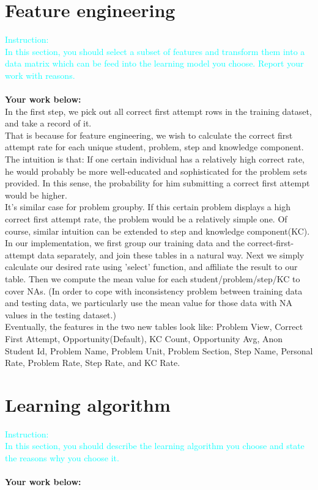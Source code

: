 \documentclass{article}
\begin{document}
\section{Feature engineering}
\textcolor{cyan}{Instruction: \\
In this section, you should select a subset of features and transform them into a data matrix which can be feed into the learning model you choose. Report your work with reasons.}\\\\
\textbf{Your work below:}\\
In the first step, we pick out all correct first attempt rows in the training dataset, and take a record of it.\\
That is because for feature engineering, we wish to calculate the correct first attempt rate for each unique student, problem, step and knowledge component.
The intuition is that: If one certain individual has a relatively high correct rate, he would probably be more well-educated and sophisticated for the problem sets provided.
In this sense, the probability for him submitting a correct first attempt would be higher.\\
It's similar case for problem groupby. If this certain problem displays a high correct first attempt rate, the problem would be a relatively simple one.
Of course, similar intuition can be extended to step and knowledge component(KC).\\
In our implementation, we first group our training data and the correct-first-attempt data separately, and join these tables in a natural way.
Next we simply calculate our desired rate using 'select' function, and affiliate the result to our table.
Then we compute the mean value for each student/problem/step/KC to cover NAs.
(In order to cope with inconsistency problem between training data and testing data, we particularly use the mean value for those data with NA values in the testing dataset.)\\
Eventually, the features in the two new tables look like:
Problem View, Correct First Attempt, Opportunity(Default), KC Count, Opportunity Avg, Anon Student Id, Problem Name, 
Problem Unit, Problem Section, Step Name, Personal Rate, Problem Rate, Step Rate, and KC Rate.


\section{Learning algorithm}
\textcolor{cyan}{Instruction: \\
In this section, you should describe the learning algorithm you choose and state the reasons why you choose it.}\\\\
\textbf{Your work below:}\\
\end{document}
